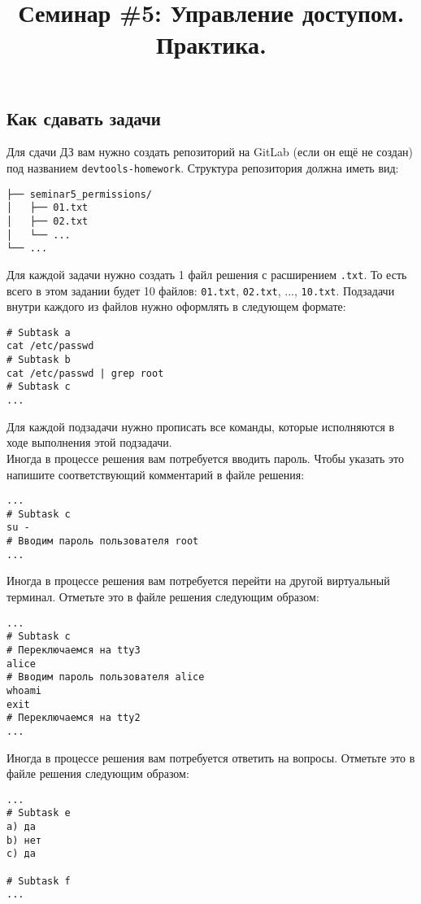 \documentclass{article}
\begin{document}
\title{Семинар \#5: Управление доступом. Практика. \vspace{-5ex}}\date{}\maketitle
\subsection*{Как сдавать задачи}
Для сдачи ДЗ вам нужно создать репозиторий на GitLab (если он ещё не создан) под названием \texttt{devtools-homework}. Структура репозитория должна иметь вид:
\begin{center}
\begin{BVerbatim}
├── seminar5_permissions/
│   ├── 01.txt
│   ├── 02.txt
│   └── ...
└── ...
\end{BVerbatim}
\end{center}
Для каждой задачи нужно создать 1 файл решения с расширением \texttt{.txt}. То есть всего в этом задании будет 10 файлов: \texttt{01.txt}, \texttt{02.txt}, ..., \texttt{10.txt}. Подзадачи внутри каждого из файлов нужно оформлять в следующем формате:
\begin{lstlisting}
# Subtask a
cat /etc/passwd
# Subtask b
cat /etc/passwd | grep root
# Subtask c
...
\end{lstlisting}
Для каждой подзадачи нужно прописать все команды, которые исполняются в ходе выполнения этой подзадачи.\\
Иногда в процессе решения вам потребуется вводить пароль. Чтобы указать это напишите соответствующий комментарий в файле решения:
\begin{lstlisting}
...
# Subtask с
su -
# Вводим пароль пользователя root
...
\end{lstlisting}
Иногда в процессе решения вам потребуется перейти на другой виртуальный терминал. Отметьте это в файле решения следующим образом:
\begin{lstlisting}
...
# Subtask с
# Переключаемся на tty3
alice
# Вводим пароль пользователя alice
whoami
exit
# Переключаемся на tty2
...
\end{lstlisting}
Иногда в процессе решения вам потребуется ответить на вопросы. Отметьте это в файле решения следующим образом:
\begin{lstlisting}
...
# Subtask e
a) да
b) нет
c) да

# Subtask f
...
\end{lstlisting}
\end{document}

